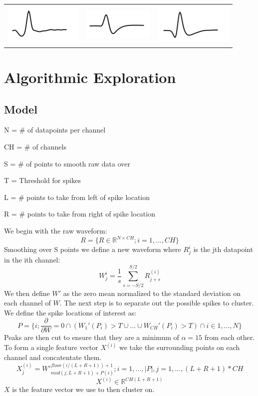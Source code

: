 \documentclass[conference]{IEEEtran}
\begin{document}
\begin{center}
  \begin{tabular}{c c c}
    \includegraphics[width=0.17\linewidth]{../poster/images/WaveShape1.png} &
    \includegraphics[width=0.17\linewidth]{../poster/images/WaveShape2.png} &
    \includegraphics[width=0.17\linewidth]{../poster/images/WaveShape3.png}
  \end{tabular}
\end{center}

\section{Algorithmic Exploration}
\subsection{Model}

N = \# of datapoints per channel

CH = \# of channels

S = \# of points to smooth raw data over

T = Threshold for spikes

L = \# points to take from left of spike location

R = \# points to take from right of spike location

We begin with the raw waveform:
$$R = \{ {R \in \mathbb{R}^{N \times CH}; i = 1,...,CH} \}$$
Smoothing over S points we define a new waveform where $R^i_j$
is the jth datapoint in the ith channel: 
$$W^i_j = \frac{1}{s}\sum_{s=-S/2}^{S/2}R^{(i)}_{j+s}$$
We then define $W'$ as the zero mean normalized to the standard
deviation on each channel of $W$. The next step is to
separate out the possible spikes to cluster. We define the
spike locations of interest as:
$$P = \{ i; \frac{\partial}{\partial W} = 0 \cap 
  (W_1'(P_i) > T \cup ... \cup W_{CH}'(P_i) > T) \cap i \in
  1,...,N \} $$
Peaks are then cut to ensure that they are a minimum of
$\alpha = 15$ from each other. To form a single feature vector $X^{(i)}$ we take the
 surrounding points on each channel and concatentate them.
 $$X^{(i)}_j = W'^{floor(i/(L+R+1))+1}_{mod(j, L+R+1) + P(i)}
  ; i = 1,...,|P|, j = 1,...,(L+R+1)*CH$$
  $$X^{(i)} \in \mathbb{R}^{CH(L+R+1)}$$
$X$ is the feature vector we use to then cluster on.
\end{document}
